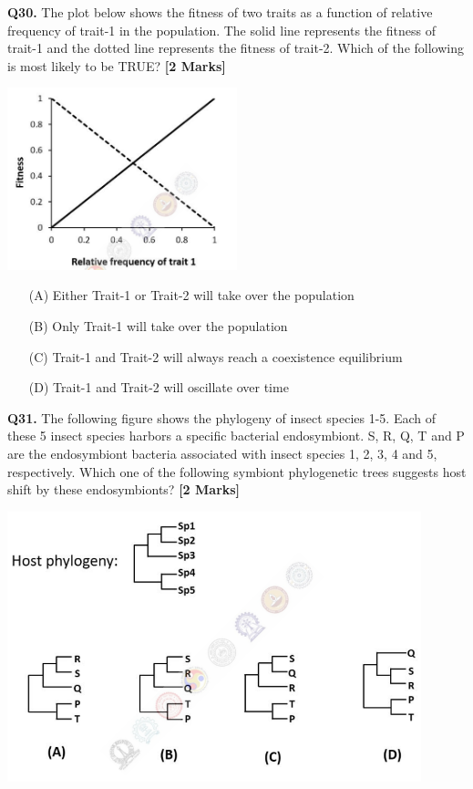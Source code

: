 \documentclass[11pt]{article}
\newcommand{\questionb}[2]{
    \noindent\textbf{Q#2.} #1 \hfill \textbf{[2 Marks]}
}
\begin{document}
\questionb{The plot below shows the fitness of two traits as a function of relative frequency of trait-1 in the population. The solid line represents the fitness of trait-1 and the dotted line represents the fitness of trait-2. Which of the following is most likely to be TRUE?}{30}
\begin{center}
\includegraphics[width=0.5\textwidth]{figures/30.png}
\end{center}
\begin{enumerate}
    \item[(A)] Either Trait-1 or Trait-2 will take over the population  
    \item[(B)] Only Trait-1 will take over the population  
    \item[(C)] Trait-1 and Trait-2 will always reach a coexistence equilibrium  
    \item[(D)] Trait-1 and Trait-2 will oscillate over time  
\end{enumerate}
\vspace{0.5cm}

\questionb{The following figure shows the phylogeny of insect species 1-5. Each of these 5 insect species harbors a specific bacterial endosymbiont. S, R, Q, T and P are the endosymbiont bacteria associated with insect species 1, 2, 3, 4 and 5, respectively. Which one of the following symbiont phylogenetic trees suggests host shift by these endosymbionts?}{31}
\begin{center}
\includegraphics[width=0.9\textwidth]{figures/31.png}
\end{center}
\vspace{0.5cm}
\end{document}
